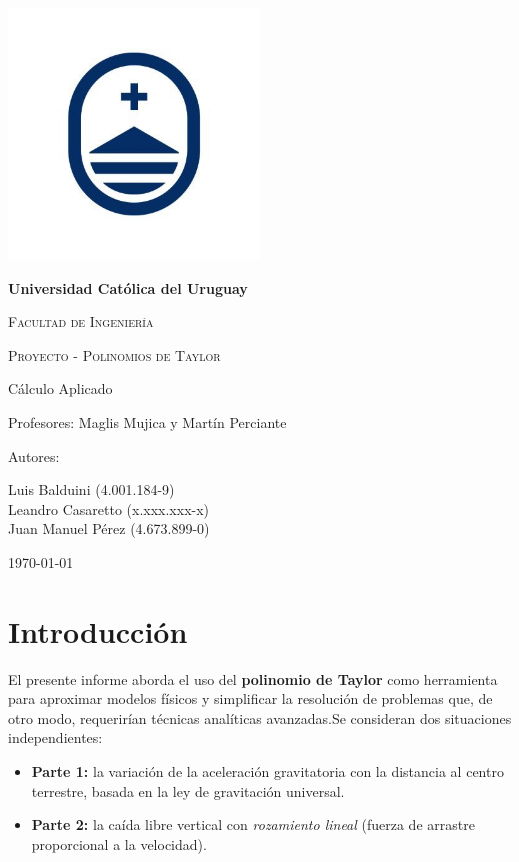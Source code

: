 \documentclass{article}
\begin{document}
    \begin{titlepage}
        \centering
        {\includegraphics[width=0.5\textwidth]{logo2}\par}
        {\bfseries\LARGE Universidad Católica del Uruguay \par}
        \vspace{0.3cm}
        {\scshape\Large Facultad de Ingeniería \par}
        \vspace{0.3cm}
        {\scshape\Huge Proyecto - Polinomios de Taylor\par}
        \vspace{1cm}
        {\Large Cálculo Aplicado \par}
        {\Large Profesores: Maglis Mujica y Martín Perciante \par}
        \vfill
        {\Large Autores: \par}
        {\Large Luis Balduini (4.001.184-9)\\Leandro Casaretto (x.xxx.xxx-x)\\Juan Manuel Pérez (4.673.899-0) \par}
        \vfill
        {\Large \today \par}
    \end{titlepage}

    \section{Introducción}\label{sec:intro}
El presente informe aborda el uso del \textbf{polinomio de Taylor} como
herramienta para aproximar modelos físicos y simplificar la resolución de
problemas que, de otro modo, requerirían técnicas analíticas avanzadas.Se consideran dos situaciones independientes:

\begin{itemize}
\item \textbf{Parte 1:} la variación de la aceleración gravitatoria con la
distancia al centro terrestre, basada en la ley de gravitación universal.
\item \textbf{Parte 2:} la caída libre vertical con \emph{rozamiento lineal}
(fuerza de arrastre proporcional a la velocidad).
\end{itemize}
\end{document}

